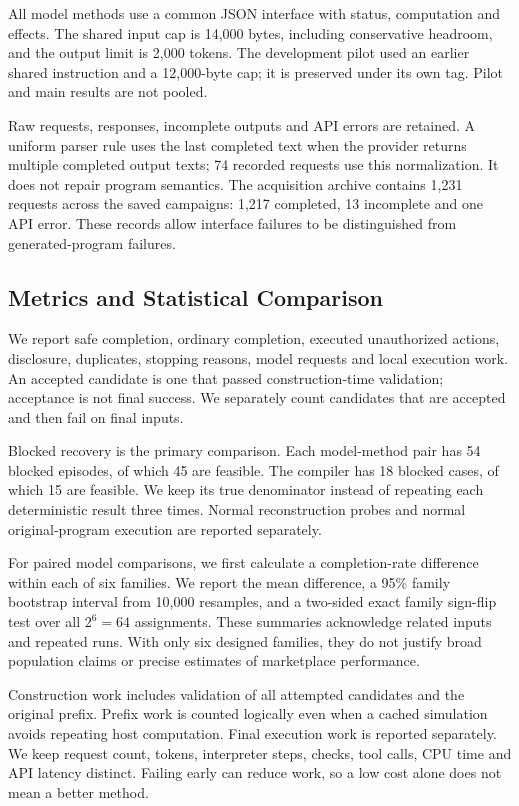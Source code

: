 \documentclass[conference]{IEEEtran}
\begin{document}
All model methods use a common JSON interface with status, computation and effects. The shared input cap is 14,000 bytes, including conservative headroom, and the output limit is 2,000 tokens. The development pilot used an earlier shared instruction and a 12,000-byte cap; it is preserved under its own tag. Pilot and main results are not pooled.

Raw requests, responses, incomplete outputs and API errors are retained. A uniform parser rule uses the last completed text when the provider returns multiple completed output texts; 74 recorded requests use this normalization. It does not repair program semantics. The acquisition archive contains 1,231 requests across the saved campaigns: 1,217 completed, 13 incomplete and one API error. These records allow interface failures to be distinguished from generated-program failures.

\subsection{Metrics and Statistical Comparison}
We report safe completion, ordinary completion, executed unauthorized actions, disclosure, duplicates, stopping reasons, model requests and local execution work. An accepted candidate is one that passed construction-time validation; acceptance is not final success. We separately count candidates that are accepted and then fail on final inputs.

Blocked recovery is the primary comparison. Each model-method pair has 54 blocked episodes, of which 45 are feasible. The compiler has 18 blocked cases, of which 15 are feasible. We keep its true denominator instead of repeating each deterministic result three times. Normal reconstruction probes and normal original-program execution are reported separately.

For paired model comparisons, we first calculate a completion-rate difference within each of six families. We report the mean difference, a 95\% family bootstrap interval from 10,000 resamples, and a two-sided exact family sign-flip test over all $2^6=64$ assignments. These summaries acknowledge related inputs and repeated runs. With only six designed families, they do not justify broad population claims or precise estimates of marketplace performance.

Construction work includes validation of all attempted candidates and the original prefix. Prefix work is counted logically even when a cached simulation avoids repeating host computation. Final execution work is reported separately. We keep request count, tokens, interpreter steps, checks, tool calls, CPU time and API latency distinct. Failing early can reduce work, so a low cost alone does not mean a better method.
\end{document}
